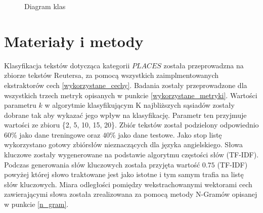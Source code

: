 \documentclass{classrep}
\begin{document}
\begin{figure}[h!]
    \centering
    \caption{Diagram klas}
    \label{fig:uml}
\end{figure}


\section{Materiały i metody} \label{mat}
Klasyfikacja tekstów dotycząca kategorii $PLACES$ została przeprowadzna na zbiorze tekstów Reutersa, za
pomocą wszystkich zaimplmentowanych ekstraktorów cech \ref{wykorzystane_cechy}. Badania zostały
przeprowadzone dla wszystkich trzech metryk opisanych w punkcie \ref{wykorzystane_metryki}. Wartości
parametru $k$ w algorytmie klasyfikującym K najbliższych sąsiadów zostały dobrane tak aby wykazać jego
wpływ na klasyfikację. Parametr ten przyjmuje wartości ze zbioru \{2, 5, 10, 15, 20\}. Zbiór tekstów
został podzielony odpowiednio $60\%$ jako dane treningowe oraz $40\%$ jako dane testowe. Jako stop listę
wykorzystano gotowy zbiór\footnotemark[1] słów nieznaczących dla języka angielskiego.
Słowa kluczowe zostały wygenerowane na podstawie algorytmu częstości słów (TF-IDF). Podczas generowania
słów kluczowych została przyjęta wartość $0.75$ (TF-IDF) powyżej której słowo traktowane jest jako istotne i
tym samym trafia na listę słów kluczowych. Miara odległości pomiędzy wekstrachowanymi wektorami cech zawierającymi słowa
została zrealizowana za pomocą metody N-Gramów opisanej w punkcie \ref{n_gram}.
\end{document}
